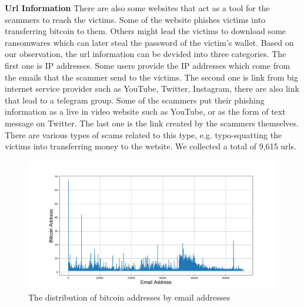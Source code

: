 \textbf{Url Information}
There are also some websites that act as a tool for the scammers to reach the victims. Some of the website phishes victims into transferring bitcoin to them. Others might lead the victims to download some ransomwares which can later steal the password of the victim's wallet. Based on our observation, the url information can be devided into three categories. The first one is IP addresses. Some users provide the IP addresses which come from the emails that the scammer send to the victims. The second one is link from big internet service provider such as YouTube\cite{YouTube}, Twitter\cite{twitter}, Instagram\cite{instagram}, there are also link that lead to a telegram\cite{telegram} group. Some of the scammers put their phishing information as a live in video website such as YouTube, or as the form of text message on Twitter. The last one is the link created by the scammers themselves. There are various types of scams related to this type, e.g. typo-squatting the victims into transferring money to the wetsite\cite{xia2020characterizing}. We collected a total of 9,615 urls.
 

\begin{figure}[tbp]
\centerline{\includegraphics[width=\columnwidth]{images/email_bitcoin.png}}
\caption{The distribution of bitcoin addresses by email addresses}
\label{fig:email_bitcoin}
\end{figure}



